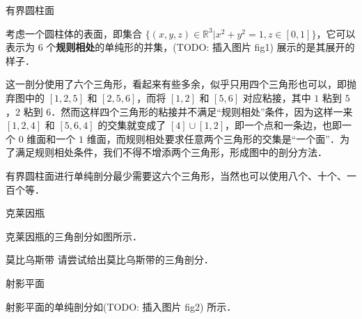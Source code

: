 \begin{example}{有界圆柱面}

考虑一个圆柱体的表面，即集合 $\{(x, y, z)\in\mathbb{R}^3|x^2+y^2=1, z\in [0, 1]\}$，它可以表示为 $6$ 个\textbf{规则相处}的单纯形的并集，(TODO: 插入图片 fig1) 展示的是其展开的样子．



这一剖分使用了六个三角形，看起来有些多余，似乎只用四个三角形也可以，即抛弃图中的 $[1,2,5]$ 和 $[2,5,6]$，而将 $[1, 2]$ 和 $[5, 6]$ 对应粘接，其中 $1$ 粘到 $5$，$2$ 粘到 $6$．然而这样四个三角形的粘接并不满足“规则相处”条件，因为这样一来 $[1, 2, 4]$ 和 $[5, 6, 4]$ 的交集就变成了 $[4]\cup[1, 2]$，即一个点和一条边，也即一个 $0$ 维面和一个 $1$ 维面，而规则相处要求任意两个三角形的交集是“一个面”．为了满足规则相处条件，我们不得不增添两个三角形，形成图中的剖分方法．



有界圆柱面进行单纯剖分最少需要这六个三角形，当然也可以使用八个、十个、一百个等．

\end{example}


\begin{example}{克莱因瓶}

克莱因瓶的三角剖分如图所示．


\end{example}


\begin{exercise}{莫比乌斯带}
请尝试给出莫比乌斯带的三角剖分．
\end{exercise}


\begin{example}{射影平面}

射影平面的单纯剖分如(TODO: 插入图片 fig2) 所示．


\end{example}


